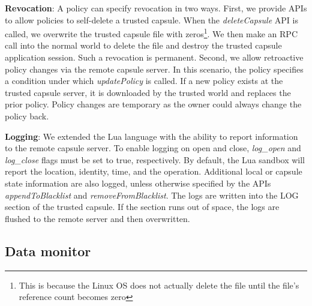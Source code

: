 \textbf{Revocation}: A policy can specify revocation in two
ways. First, we provide APIs to allow policies to self-delete a trusted
capsule. When the \textit{deleteCapsule} API is called, we overwrite
the trusted capsule file with zeros\footnote{This is because the Linux OS does not
    actually delete the file until the file's reference count becomes zero}. We then
make an RPC call into the normal world to delete the file and destroy the
trusted capsule application session. Such a revocation is permanent.  Second, we
allow retroactive policy changes via the remote capsule server. In this
scenario, the policy specifies a condition under which \textit{updatePolicy} is
called. If a new policy exists at the trusted capsule server, it is downloaded
by the trusted world and replaces the prior policy. Policy changes are temporary as the owner
could always change the policy back. %

\textbf{Logging}: We extended the Lua language with the ability to report
information to the remote capsule server. To enable logging on open and close, \textit{log\_open}
and \textit{log\_close} flags must be set to true, respectively.
By default, the Lua sandbox will report the location,
identity, time, and the operation. Additional local or capsule state information are
also logged, unless otherwise specified by the APIs \textit{appendToBlacklist}
and \textit{removeFromBlacklist}. The logs are written into the LOG section of
the trusted capsule.  If the section runs out of space, the logs are flushed to
the remote server and then overwritten. %


\subsection{Data monitor}

